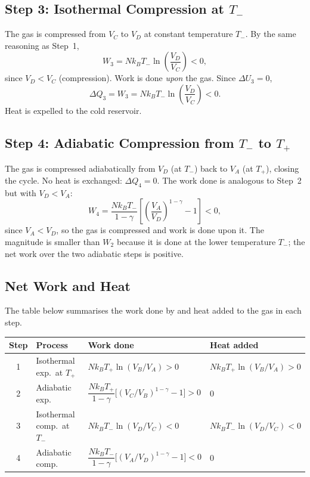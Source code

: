 \subsection{Step 3: Isothermal Compression at $T_-$}

The gas is compressed from $V_C$ to $V_D$ at constant temperature $T_-$. By the same reasoning as Step~1,
\begin{equation}
    W_3 = Nk_BT_-\ln\!\left(\frac{V_D}{V_C}\right) < 0,
\end{equation}
since $V_D < V_C$ (compression). Work is done \emph{upon} the gas. Since $\Delta U_3 = 0$,
\begin{equation}
    \Delta Q_3 = W_3 = Nk_BT_-\ln\!\left(\frac{V_D}{V_C}\right) < 0.
\end{equation}
Heat is expelled to the cold reservoir.

\subsection{Step 4: Adiabatic Compression from $T_-$ to $T_+$}

The gas is compressed adiabatically from $V_D$ (at $T_-$) back to $V_A$ (at $T_+$), closing the cycle. No heat is exchanged: $\Delta Q_4 = 0$. The work done is analogous to Step~2 but with $V_D < V_A$:
\begin{equation}
    W_4 = \frac{Nk_BT_-}{1-\gamma}\left[\left(\frac{V_A}{V_D}\right)^{1-\gamma} - 1\right] < 0,
\end{equation}
since $V_A < V_D$, so the gas is compressed and work is done upon it. The magnitude is smaller than $W_2$ because it is done at the lower temperature $T_-$; the net work over the two adiabatic steps is positive.

\subsection{Net Work and Heat}

The table below summarises the work done by and heat added to the gas in each step.

\begin{center}
\begin{tabular}{clll}
    \hline
    Step & Process & Work done & Heat added \\
    \hline
    1 & Isothermal exp.\ at $T_+$ & $Nk_BT_+\ln(V_B/V_A) > 0$ & $Nk_BT_+\ln(V_B/V_A) > 0$ \\
    2 & Adiabatic exp. & $\dfrac{Nk_BT_+}{1-\gamma}\bigl[(V_C/V_B)^{1-\gamma}-1\bigr] > 0$ & $0$ \\
    3 & Isothermal comp.\ at $T_-$ & $Nk_BT_-\ln(V_D/V_C) < 0$ & $Nk_BT_-\ln(V_D/V_C) < 0$ \\
    4 & Adiabatic comp. & $\dfrac{Nk_BT_-}{1-\gamma}\bigl[(V_A/V_D)^{1-\gamma}-1\bigr] < 0$ & $0$ \\
    \hline
\end{tabular}
\end{center}

